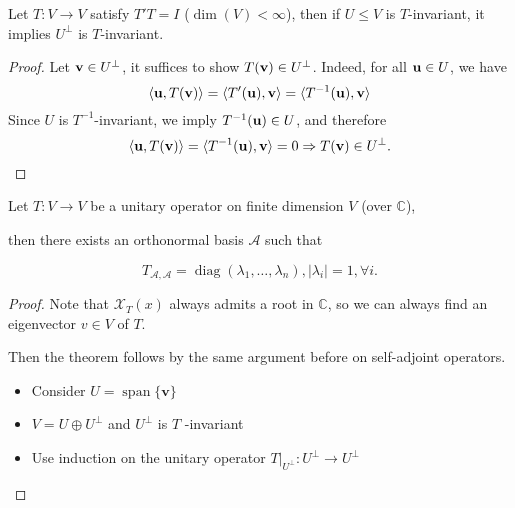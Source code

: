\begin{proposition}
Let \( T : V \to V \) satisfy \( T'T = I \) (\( \dim(V) < \infty \)), then if \( U \leq V \) is \( T \)-invariant, it implies \( U^\perp \) is \( T \)-invariant.
\end{proposition}

\begin{proof}
Let \( {\bf v} \in U^\perp \), it suffices to show \( T({\bf v}) \in U^\perp \). Indeed, for all \({\bf  u} \in U \), we have
\[
\langle {\bf u}, T({\bf v}) \rangle = \langle T'({\bf u}), {\bf v} \rangle = \langle T^{-1}({\bf u}), {\bf v} \rangle
\]
Since \( U \) is \( T^{-1} \)-invariant, we imply \( T^{-1}({\bf u}) \in U \), and therefore
\[
\langle {\bf u}, T({\bf v}) \rangle = \langle T^{-1}({\bf u}), {\bf v} \rangle = 0 \Rightarrow T({\bf v}) \in U^\perp.
\]
\end{proof}

\begin{theorem} Let \(T : V \rightarrow  V\) be a unitary operator on finite dimension \(V\) (over \(\mathbb{C}\)),

then there exists an orthonormal basis \(\mathcal{A}\) such that

\[
T_{\mathcal{A},\mathcal{A}} = \operatorname{diag}\left( {{\lambda }_{1},\ldots,{\lambda }_{n}}\right),\left| {\lambda }_{i}\right|  = 1,\forall i.
\]
\end{theorem}

\begin{proof} Note that \({\mathcal{X}}_{T}\left( x\right)\) always admits a root in \(\mathbb{C}\), so we can always find an eigenvector \(v \in  V\) of \(T\).

Then the theorem follows by the same argument before on self-adjoint operators.

\begin{itemize}
\item Consider \(U = \operatorname{span}\{ \mathbf{v}\}\)
\end{itemize}

\begin{itemize}
\item \(V = U \oplus  {U}^{ \bot  }\) and \({U}^{ \bot  }\) is \(T\) -invariant
\end{itemize}

\begin{itemize}
\item Use induction on the unitary operator \({\left. T\right| }_{{U}^{ \bot  }} : {U}^{ \bot  } \rightarrow  {U}^{ \bot  }\)
\end{itemize}
\end{proof}

